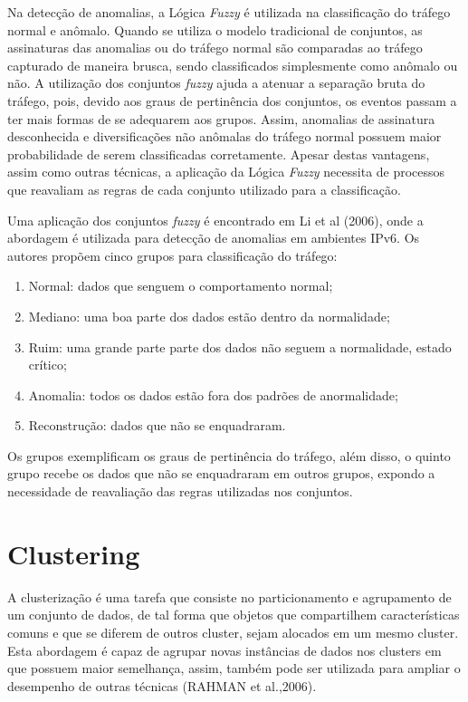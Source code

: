 \indent Na detecção de anomalias, a Lógica\textit{ Fuzzy} é utilizada na classificação do tráfego normal e anômalo. Quando se utiliza o modelo tradicional de conjuntos, as assinaturas das anomalias ou do tráfego normal são comparadas ao tráfego capturado de maneira brusca, sendo classificados simplesmente como anômalo ou não. A utilização dos conjuntos \textit{fuzzy} ajuda a atenuar a separação bruta do tráfego, pois, devido aos graus de pertinência dos conjuntos, os eventos passam a ter mais formas de se adequarem aos grupos. Assim, anomalias de assinatura desconhecida e diversificações não anômalas do tráfego normal possuem maior probabilidade de serem classificadas corretamente. Apesar destas vantagens, assim como outras técnicas, a aplicação da Lógica \textit{Fuzzy} necessita de processos que reavaliam as regras de cada conjunto utilizado para a classificação.

\indent Uma aplicação dos conjuntos \textit{fuzzy} é encontrado em Li et al (2006), onde a abordagem é utilizada  para detecção de anomalias em ambientes IPv6. Os autores propõem cinco grupos para classificação do tráfego:
\begin{enumerate}
  \item Normal: dados que senguem o comportamento normal;
  \item Mediano: uma boa parte dos dados estão dentro da normalidade;
  \item Ruim: uma grande parte parte dos dados não seguem a normalidade, estado crítico;
  \item Anomalia: todos os dados estão fora dos padrões de anormalidade;
  \item Reconstrução: dados que não se enquadraram.
\end{enumerate}

\indent Os grupos exemplificam os graus de pertinência do tráfego, além disso, o quinto grupo recebe os dados que não se enquadraram em outros grupos, expondo a necessidade de reavaliação das regras utilizadas nos conjuntos.

  \section{Clustering}
\indent A clusterização é uma tarefa que consiste no particionamento e agrupamento de um conjunto de dados, de tal forma que objetos que compartilhem características comuns e que se diferem de outros cluster, sejam alocados em um mesmo cluster. Esta abordagem é capaz de agrupar novas instâncias de dados nos clusters em que possuem maior semelhança, assim, também pode ser utilizada para ampliar o desempenho de outras técnicas (RAHMAN et al.,2006).

